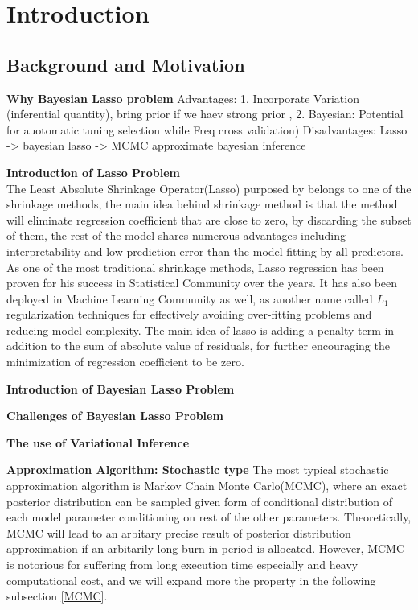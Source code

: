 \chapter{Introduction}
\label{Chapter1}
\section{Background and Motivation}


\textbf{Why Bayesian Lasso problem}
Advantages: 1. Incorporate Variation (inferential quantity), bring prior if we haev strong prior , 2. Bayesian: Potential for auotomatic tuning selection while Freq cross validation)
Disadvantages:
Lasso -> bayesian lasso -> MCMC approximate bayesian inference

\textbf{Introduction of Lasso Problem}\\
The Least Absolute Shrinkage Operator(Lasso) purposed by \cite{tibshirani_1996} belongs to one of the shrinkage methods, the main idea behind shrinkage method is that the method will eliminate regression coefficient that are close to zero, by discarding the subset of them, the rest of the model shares numerous advantages including interpretability and low prediction error than the model fitting by all predictors. As one of the most traditional shrinkage methods, Lasso regression has been proven for his success in Statistical Community over the years. It has also been deployed in Machine Learning Community as well, as another name called $L_1$ regularization techniques for effectively avoiding over-fitting problems and reducing model complexity. The main idea of lasso is adding a penalty term in addition to the sum of absolute value of residuals, for further encouraging the minimization of regression coefficient to be zero.



\textbf{Introduction of Bayesian Lasso Problem}


\textbf{Challenges of Bayesian Lasso Problem}

\textbf{The use of Variational Inference}





\textbf{Approximation Algorithm: Stochastic type}
The most typical stochastic approximation algorithm is Markov Chain Monte Carlo(MCMC), where an exact posterior distribution can be sampled given form of conditional distribution of each model parameter conditioning on rest of the other parameters. Theoretically, MCMC will lead to an arbitary precise result of posterior distribution approximation if an arbitarily long burn-in period is allocated. However, MCMC is notorious for suffering from long execution time especially and heavy computational cost, and we will expand more the property in the following subsection \ref{MCMC}.

